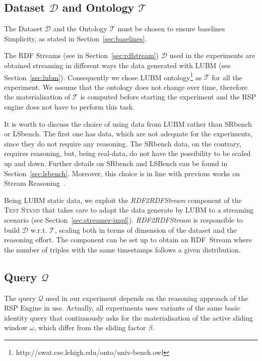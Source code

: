 \subsection{Dataset $\mathcal{D}$ and Ontology $\mathcal{T}$}\label{sec:dataset}

\noindent The Dataset  $\mathcal{D}$ and the Ontology $\mathcal{T}$ must be chosen to ensure baselines Simplicity, as stated in Section~\ref{sec:baselines}. 

The RDF Streams (see in Section~\ref{sec:rdfstream}) $\mathcal{D}$ used in the experiments are obtained streaming in different ways the data generated with LUBM (see Section~\ref{sec:lubm}). Consequently we chose LUBM ontology\footnote{http://swat.cse.lehigh.edu/onto/univ-bench.owl} as $\mathcal{T}$ for all the experiment. We assume that the ontology does not change over time, therefore the materialisation of $\mathcal{T}$ is computed before starting the experiment and the RSP engine does not have to perform this task. 

It is worth to discuss the choice of using data from LUBM rather than SRbench or LSbench. The first one has data, which are not adequate for the experiments, since they do not require any reasoning. The SRbench data, on the contrary, requires reasoning, but, being real-data, do not have the possibility to be scaled up and down. Further details on SRbench and LSBench can be found in Section~\ref{sec:lsbench}. Moreover, this choice is in line with previous works on Stream Reasoning~\cite{DBLP:conf/semweb/UrbaniMJHB13}. 

Being LUBM static data, we exploit the \textit{RDF2RDFStream} component of the \textsc{Test Stand} that takes care to adapt the data generate by LUBM to a streaming scenario (see Section~\ref{sec:streamer-impl}). \textit{RDF2RDFStream} is responsible to build $\mathcal{D}$ w.r.t. $\mathcal{T}$, scaling both in terms of dimension of the dataset and the reasoning effort. The component can be set up to obtain an RDF~Stream where the number of triples with the same timestamps follows a given distribution. %

\subsection{Query $\mathcal{Q}$}\label{sec:query}
 
The query $\mathcal{Q}$ used in our experiment depends on the reasoning approach of the RSP Engine in use. Actually, all  experiments uses variants of the same basic identity query that continuously asks for the materialisation of the active sliding window $\omega$, which differ from the sliding factor $\beta$.\\

